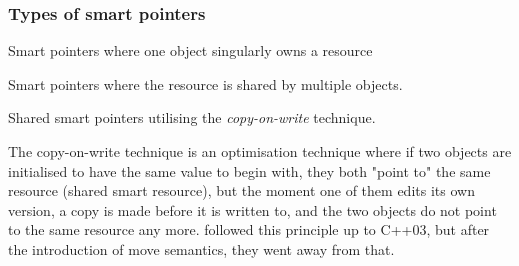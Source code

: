 \documentclass[11pt,a4paper,dvipsnames,usenames]{beamer}
\newcommand{\std}[1]{{\ttfamily {\color{RoyalBlue} std::}{\color{OliveGreen}#1}}}
\begin{document}
\begin{frame}
  \frametitle{Types of smart pointers}

  \vfill

  Smart pointers where one object singularly owns a resource

  \vfill

  Smart pointers where the resource is shared by multiple objects.

  \vfill

  Shared smart pointers utilising the \emph{copy-on-write} technique.

  \vfill

  \note
  {
    The copy-on-write technique is an optimisation technique where if two objects are initialised to have 
    the same value to begin with, they both "point to" the same resource (shared smart resource), but the
    moment one of them edits its own version, a copy is made before it is written to, and the two objects
    do not point to the same resource any more. \std{string} followed this principle up to C++03, but 
    after the introduction of move semantics, they went away from that.
  }
\end{frame}
\end{document}
